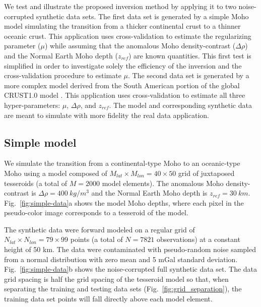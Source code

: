 \documentclass[extra]{gji}
\begin{document}
We test and illustrate the proposed inversion method
by applying it to two noise-corrupted synthetic data sets.
The first data set is generated by a simple Moho model simulating the transition
from a thicker continental crust to a thinner oceanic crust.
This application uses cross-validation to estimate the regularizing parameter
($\mu$) while assuming that the anomalous Moho density-contrast ($\Delta\rho$)
and the Normal Earth Moho depth ($z_{ref}$) are known quantities.
This first test is simplified in order to investigate solely
the efficiency of the inversion and
the cross-validation procedure to estimate $\mu$.
The second data set is generated by a more complex model derived from
the South American portion of the global CRUST1.0 model \citep{laske2013}.
This application uses cross-validation to estimate all three hyper-parameters:
$\mu$, $\Delta\rho$, and $z_{ref}$.
The model and corresponding synthetic data are meant to simulate
with more fidelity the real data application.


\subsection{Simple model}\label{sec:simple-synthetic}

We simulate the transition from a continental-type Moho to an oceanic-type Moho
using a model composed of $M_{lat} \times M_{lon} = 40 \times 50$ grid of
juxtaposed tesseroids (a total of $M = 2000$ model elements).
The anomalous Moho density-contrast is $\Delta\rho = 400\ kg/m^3$
and the Normal Earth Moho depth is $z_{ref} = 30\ km$.
Fig.~\ref{fig:simple-data}a shows the model Moho depths,
where each pixel in the pseudo-color image corresponds to
a tesseroid of the model.

The synthetic data were forward modeled on a regular grid of
$N_{lat} \times N_{lon} = 79 \times 99$ points
(a total of $N = 7821$ observations)
at a constant height of 50 km.
The data were contaminated with pseudo-random noise
sampled from a normal distribution with zero mean and 5 mGal standard deviation.
Fig.~\ref{fig:simple-data}b shows the noise-corrupted full synthetic data set.
The data grid spacing is half the grid spacing of the tesseroid model
so that, when separating the training and testing data sets
(Fig.~\ref{fig:grid_separation}),
the training data set points will fall directly above each model element.
\end{document}
